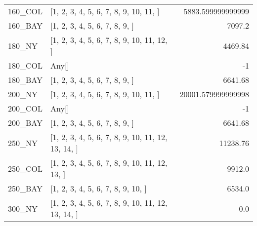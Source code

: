 \documentclass[main.tex]{subfiles}
\begin{document}
\begin{center}
\begin{tabular}{llr}
160\_COL & [1, 2, 3, 4, 5, 6, 7, 8, 9, 10, 11, ] & 5883.599999999999\\
160\_BAY & [1, 2, 3, 4, 5, 6, 7, 8, 9, ] & 7097.2\\
180\_NY & [1, 2, 3, 4, 5, 6, 7, 8, 9, 10, 11, 12, ] & 4469.84\\
180\_COL & Any[] & -1\\
180\_BAY & [1, 2, 3, 4, 5, 6, 7, 8, 9, ] & 6641.68\\
200\_NY & [1, 2, 3, 4, 5, 6, 7, 8, 9, 10, 11, ] & 20001.579999999998\\
200\_COL & Any[] & -1\\
200\_BAY & [1, 2, 3, 4, 5, 6, 7, 8, 9, ] & 6641.68\\
250\_NY & [1, 2, 3, 4, 5, 6, 7, 8, 9, 10, 11, 12, 13, 14, ] & 11238.76\\
250\_COL & [1, 2, 3, 4, 5, 6, 7, 8, 9, 10, 11, 12, 13, ] & 9912.0\\
250\_BAY & [1, 2, 3, 4, 5, 6, 7, 8, 9, 10, ] & 6534.0\\
300\_NY & [1, 2, 3, 4, 5, 6, 7, 8, 9, 10, 11, 12, 13, 14, ] & 0.0\\
\hline\end{tabular}
\end{center}
\newpage
\end{document}
